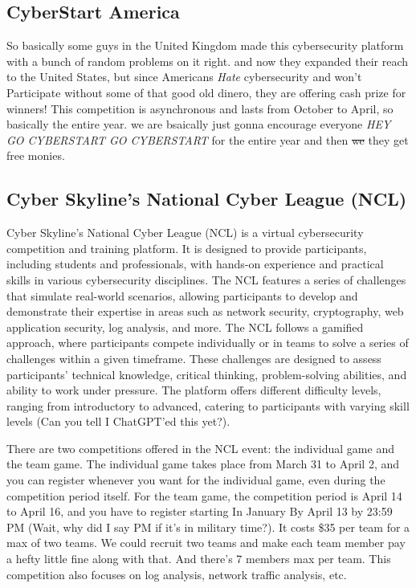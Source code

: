 \documentclass[
  letterpaper,
  DIV=11,
  numbers=noendperiod]{scrartcl}
\begin{document}
\hypertarget{cyberstart-america}{%
\subsection{CyberStart America}\label{cyberstart-america}}

So basically some guys in the United Kingdom made this cybersecurity
platform with a bunch of random problems on it right. and now they
expanded their reach to the United States, but since Americans
\emph{Hate} cybersecurity and won't Participate without some of that
good old dinero, they are offering cash prize for winners! This
competition is asynchronous and lasts from October to April, so
basically the entire year. we are bsaically just gonna encourage
everyone \emph{HEY GO CYBERSTART GO CYBERSTART} for the entire year and
then \st{we} they get free monies.

\hypertarget{cyber-skylines-national-cyber-league-ncl}{%
\subsection{Cyber Skyline's National Cyber League
(NCL)}\label{cyber-skylines-national-cyber-league-ncl}}

Cyber Skyline's National Cyber League (NCL) is a virtual cybersecurity
competition and training platform. It is designed to provide
participants, including students and professionals, with hands-on
experience and practical skills in various cybersecurity disciplines.
The NCL features a series of challenges that simulate real-world
scenarios, allowing participants to develop and demonstrate their
expertise in areas such as network security, cryptography, web
application security, log analysis, and more. The NCL follows a gamified
approach, where participants compete individually or in teams to solve a
series of challenges within a given timeframe. These challenges are
designed to assess participants' technical knowledge, critical thinking,
problem-solving abilities, and ability to work under pressure. The
platform offers different difficulty levels, ranging from introductory
to advanced, catering to participants with varying skill levels (Can you
tell I ChatGPT'ed this yet?).

There are two competitions offered in the NCL event: the individual game
and the team game. The individual game takes place from March 31 to
April 2, and you can register whenever you want for the individual game,
even during the competition period itself. For the team game, the
competition period is April 14 to April 16, and you have to register
starting In January By April 13 by 23:59 PM (Wait, why did I say PM if
it's in military time?). It costs \$35 per team for a max of two teams.
We could recruit two teams and make each team member pay a hefty little
fine along with that. And there's 7 members max per team. This
competition also focuses on log analysis, network traffic analysis, etc.
\end{document}
